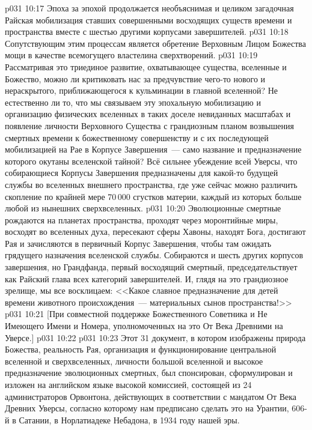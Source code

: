 \vs p031 10:17 Эпоха за эпохой продолжается необъяснимая и целиком загадочная Райская мобилизация ставших совершенными восходящих существ времени и пространства вместе с шестью другими корпусами завершителей.
\vs p031 10:18 Сопутствующим этим процессам является обретение Верховным Лицом Божества мощи в качестве всемогущего властелина сверхтворений.
\vs p031 10:19 \pc Рассматривая это триединое развитие, охватывающее существа, вселенные и Божество, можно ли критиковать нас за предчувствие чего\hyp{}то нового и нераскрытого, приближающегося к кульминации в главной вселенной? Не естественно ли то, что мы связываем эту эпохальную мобилизацию и организацию физических вселенных в таких доселе невиданных масштабах и появление личности Верховного Существа с грандиозным планом возвышения смертных времени к божественному совершенству и с их последующей мобилизацией на Рае в Корпусе Завершения~--- само название и предназначение которого окутаны вселенской тайной? Всё сильнее убеждение всей Уверсы, что собирающиеся Корпусы Завершения предназначены для какой\hyp{}то будущей службы во вселенных внешнего пространства, где уже сейчас можно различить скопление по крайней мере 70\,000 сгустков материи, каждый из которых больше любой из нынешних сверхвселенных.
\vs p031 10:20 \pc Эволюционные смертные рождаются на планетах пространства, проходят через моронтийные миры, восходят во вселенных духа, пересекают сферы Хавоны, находят Бога, достигают Рая и зачисляются в первичный Корпус Завершения, чтобы там ожидать грядущего назначения вселенской службы. Собираются и шесть других корпусов завершения, но Грандфанда, первый восходящий смертный, председательствует как Райский глава всех категорий завершителей. И, глядя на это грандиозное зрелище, мы все восклицаем: <<Какое славное предназначение для детей времени животного происхождения~--- материальных сынов пространства!>>
\vsetoff
\vs p031 10:21 [При совместной поддержке Божественного Советника и Не Имеющего Имени и Номера, уполномоченных на это От Века Древними на Уверсе.]
\vs p031 10:22 \separatorline
\vs p031 10:23 Этот 31 документ, в котором изображены природа Божества, реальность Рая, организация и функционирование центральной вселенной и сверхвселенных, личности большой вселенной и высокое предназначение эволюционных смертных, был спонсирован, сформулирован и изложен на английском языке высокой комиссией, состоящей из 24 администраторов Орвонтона, действующих в соответствии с мандатом От Века Древних Уверсы, согласно которому нам предписано сделать это на Урантии, 606\hyp{}й в Сатании, в Норлатиадеке Небадона, в 1934 году нашей эры.
\quizlink

